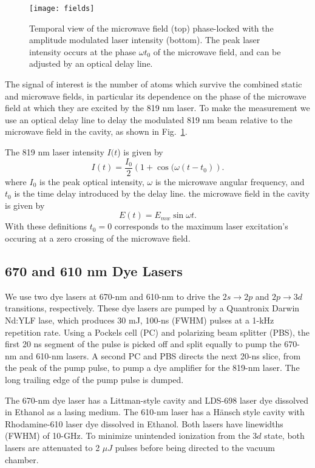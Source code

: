 \documentclass[aps,pra,preprint,groupedaddress]{revtex4-1}
\begin{document}
\begin{figure}
	\texttt{[image: fields]}
	\caption{Temporal view of the microwave field (top) phase-locked with the amplitude modulated laser intensity (bottom). The peak laser intensity occurs at the phase $\omega t_0$ of the microwave field, and can be adjusted by an optical delay line.}
	\label{fig:AMLaser}
\end{figure}

The signal of interest is the number of atoms which survive the combined static and microwave fields, in particular its dependence on the phase of the microwave field at which they are excited by the 819 nm laser. To make the measurement we use an optical delay line to delay the modulated 819 nm beam relative to the microwave field in the cavity, as shown in Fig.~\ref{fig:AMLaser}.

The 819 nm laser intensity $I(t$) is given by
\begin{equation}
I(t) =\frac{I_0}{2}(1+\cos{(\omega (t-t_0)}).
\end{equation}
where $I_0$ is the peak optical intensity, $\omega$ is the microwave angular frequency, and $t_0$ is the time delay introduced by the delay line. the microwave field in the cavity is given by
\begin{equation}
E(t) =E_{mw}\sin{\omega t}.
\end{equation}
With these definitions $t_0=0$ corresponds to the maximum laser excitation's occuring at a zero crossing of the microwave field.

\subsection{\label{sec:dye} 670 and 610 nm Dye Lasers}

We use two dye lasers at 670-nm and 610-nm to drive the $2s \rightarrow 2p$ and $2p \rightarrow 3d$ transitions, respectively. These dye lasers are pumped by a Quantronix Darwin Nd:YLF lase, which produces 30 mJ, 100-ns (FWHM) pulses at a 1-kHz repetition rate. Using a Pockels cell (PC) and polarizing beam splitter (PBS), the first 20 ns segment of the pulse is picked off and split equally to pump the 670-nm and 610-nm lasers. A second PC and PBS directs the next 20-ns slice, from the peak of the pump pulse, to pump a dye amplifier for the 819-nm laser. The long trailing edge of the pump pulse is dumped.

The 670-nm dye laser has a Littman-style cavity and LDS-698 laser dye dissolved in Ethanol as a lasing medium. The 610-nm laser has a H{\"a}nsch style cavity with Rhodamine-610 laser dye dissolved in Ethanol. Both lasers have linewidths (FWHM) of 10-GHz. To minimize unintended ionization from the $3d$ state, both lasers are attenuated to 2 $\mu J$ pulses before being directed to the vacuum chamber.
\end{document}
